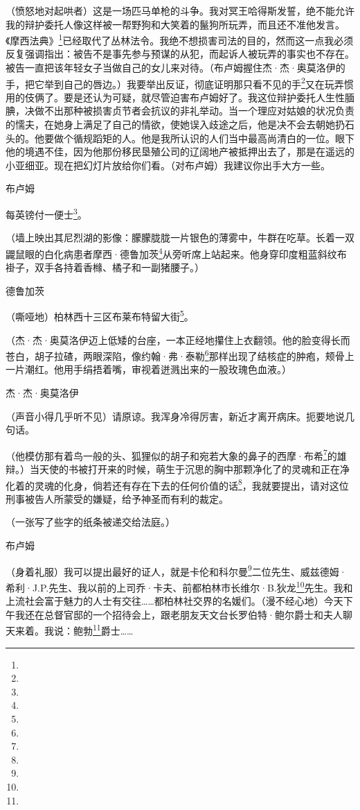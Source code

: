 \par （愤怒地对起哄者）这是一场匹马单枪的斗争。我对冥王哈得斯发誓，绝不能允许我的辩护委托人像这样被一帮野狗和大笑着的鬣狗所玩弄，而且还不准他发言。《摩西法典》\footnote{}已经取代了丛林法令。我绝不想损害司法的目的，然而这一点我必须反复强调指出：被告不是事先参与预谋的从犯，而起诉人被玩弄的事实也不存在。被告一直把该年轻女子当做自己的女儿来对待。（布卢姆握住杰·杰·奥莫洛伊的手，把它举到自己的唇边。）我要举出反证，彻底证明那只看不见的手\footnote{}又在玩弄惯用的伎俩了。要是还认为可疑，就尽管迫害布卢姆好了。我这位辩护委托人生性腼腆，决做不出那种被损害贞节者会抗议的非礼举动。当一个理应对姑娘的状况负责的懦夫，在她身上满足了自己的情欲，使她误入歧途之后，他是决不会去朝她扔石头的。他要做个循规蹈矩的人。他是我所认识的人们当中最高尚清白的一位。眼下他的境遇不佳，因为他那份移民垦殖公司的辽阔地产被抵押出去了，那是在遥远的小亚细亚。现在把幻灯片放给你们看。（对布卢姆）我建议你出手大方一些。
\par 布卢姆
\par 每英镑付一便士\footnote{}。
\par （墙上映出其尼烈湖的影像：朦朦胧胧一片银色的薄雾中，牛群在吃草。长着一双鼹鼠眼的白化病患者摩西·德鲁加茨\footnote{}从旁听席上站起来。他身穿印度粗蓝斜纹布褂子，双手各持着香橼、橘子和一副猪腰子。）
\par 德鲁加茨
\par （嘶哑地）柏林西十三区布莱布特留大街\footnote{}。
\par （杰·杰·奥莫洛伊迈上低矮的台座，一本正经地攥住上衣翻领。他的脸变得长而苍白，胡子拉碴，两眼深陷，像约翰·弗·泰勒\footnote{}那样出现了结核症的肿疱，颊骨上一片潮红。他用手绢捂着嘴，审视着迸溅出来的一股玫瑰色血液。）
\par 杰·杰·奥莫洛伊
\par （声音小得几乎听不见）请原谅。我浑身冷得厉害，新近才离开病床。扼要地说几句话。
\par （他模仿那有着鸟一般的头、狐狸似的胡子和宛若大象的鼻子的西摩·布希\footnote{}的雄辩。）当天使的书被打开来的时候，萌生于沉思的胸中那颗净化了的灵魂和正在净化着的灵魂的化身，倘若还有存在下去的任何价值的话\footnote{}，我就要提出，请对这位刑事被告人所蒙受的嫌疑，给予神圣而有利的裁定。
\par （一张写了些字的纸条被递交给法庭。）
\par 布卢姆
\par （身着礼服）我可以提出最好的证人，就是卡伦和科尔曼\footnote{}二位先生、威兹德姆·希利·J.P.先生、我以前的上司乔·卡夫、前都柏林市长维尔·B.狄龙\footnote{}先生。我和上流社会富于魅力的人士有交往……都柏林社交界的名媛们。（漫不经心地）今天下午我还在总督官邸的一个招待会上，跟老朋友天文台长罗伯特·鲍尔爵士和夫人聊天来着。我说：鲍勃\footnote{}爵士……
